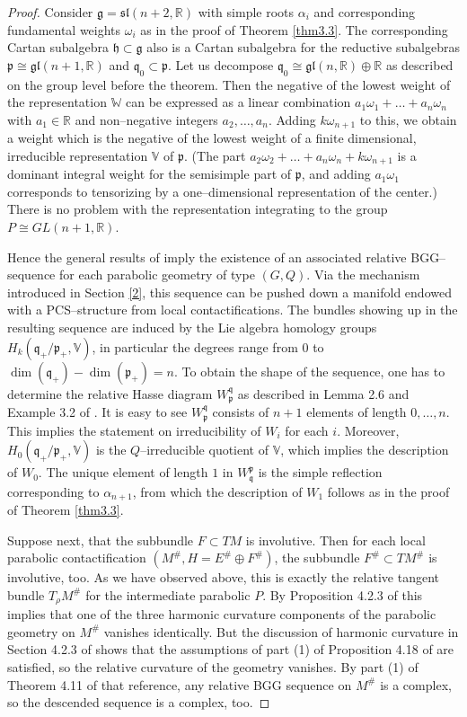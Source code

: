 \documentclass[12pt,a4paper]{amsart}
\def\frak{\mathfrak}
\def\Bbb{\mathbb}
\newcommand{\al}{\alpha}
\newcommand{\om}{\omega}
\newcounter{theorem}
\numberwithin{theorem}{section}
\theoremstyle{definition}
\theoremstyle{remark}
\begin{document}
\begin{proof}
  Consider $\frak g=\frak{sl}(n+2,\Bbb R)$ with simple roots $\al_i$
  and corresponding fundamental weights $\om_i$ as in the proof of
  Theorem \ref{thm3.3}. The corresponding Cartan subalgebra $\frak
  h\subset\frak g$ also is a Cartan subalgebra for the reductive
  subalgebras $\frak p\cong \frak{gl}(n+1,\Bbb R)$ and $\frak
  q_0\subset\frak p$. Let us decompose $\frak q_0\cong\frak{gl}(n,\Bbb
  R)\oplus\Bbb R$ as described on the group level before the
  theorem. Then the negative of the lowest weight of the
  representation $\Bbb W$ can be expressed as a linear combination
  $a_1\om_1+\dots +a_n\om_n$ with $a_1\in\Bbb R$ and non--negative
  integers $a_2,\dots,a_n$. Adding $k\om_{n+1}$ to this, we obtain a
  weight which is the negative of the lowest weight of a finite
  dimensional, irreducible representation $\Bbb V$ of $\frak p$. (The
  part $a_2\om_2+\dots+a_n\om_n+k\om_{n+1}$ is a dominant integral
  weight for the semisimple part of $\frak p$, and adding $a_1\om_1$
  corresponds to tensorizing by a one--dimensional representation of
  the center.) There is no problem with the representation integrating
  to the group $P\cong GL(n+1,\Bbb R)$.

Hence the general results of \cite{Rel-BGG2} imply the existence of an
associated relative BGG--sequence for each parabolic geometry of type
$(G,Q)$. Via the mechanism introduced in Section \ref{2}, this
sequence can be pushed down a manifold endowed with a PCS--structure
from local contactifications. The bundles showing up in the resulting
sequence are induced by the Lie algebra homology groups $H_k(\frak
q_+/\frak p_+,\Bbb V)$, in particular the degrees range from $0$ to
$\dim(\frak q_+)-\dim(\frak p_+)=n$. To obtain the shape of the
sequence, one has to determine the relative Hasse diagram $W^{\frak
  q}_{\frak p}$ as described in Lemma 2.6 and Example 3.2 of
\cite{Rel-BGG1}. It is easy to see $W^{\frak q}_{\frak p}$ consists of
$n+1$ elements of length $0,\dots,n$. This implies the statement on
irreducibility of $W_i$ for each $i$. Moreover, $H_0(\frak
q_+/\frak p_+,\Bbb V)$ is the $Q$--irreducible quotient of $\Bbb V$,
which implies the description of $W_0$. The unique element of length
$1$ in $W^{\frak p}_{\frak q}$ is the simple reflection corresponding
to $\al_{n+1}$, from which the description of $W_1$ follows as in the
proof of Theorem \ref{thm3.3}. 

Suppose next, that the subbundle $F\subset TM$ is involutive. Then for
each local parabolic contactification $(M^\#,H=E^\#\oplus F^\#)$, the
subbundle $F^\#\subset TM^\#$ is involutive, too. As we have observed
above, this is exactly the relative tangent bundle $T_\rho M^\#$ for
the intermediate parabolic $P$. By Proposition 4.2.3 of \cite{book}
this implies that one of the three harmonic curvature components of
the parabolic geometry on $M^\#$ vanishes identically. But the
discussion of harmonic curvature in Section 4.2.3 of \cite{book} shows
that the assumptions of part (1) of Proposition 4.18 of
\cite{Rel-BGG2} are satisfied, so the relative curvature of the
geometry vanishes. By part (1) of Theorem 4.11 of that reference, any
relative BGG sequence on $M^\#$ is a complex, so the descended
sequence is a complex, too. 


\end{proof}
\end{document}
